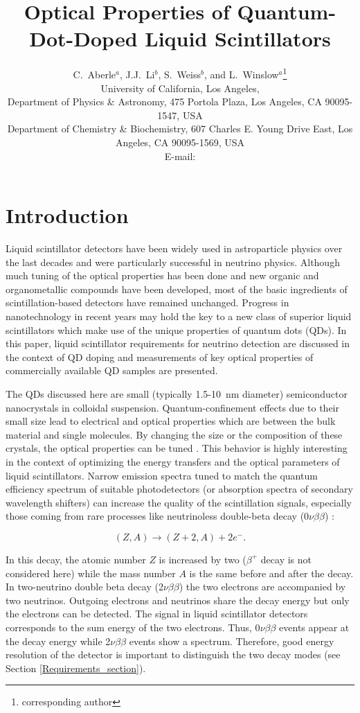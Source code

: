 \documentclass[cits]{JINST}
\title{Optical Properties of Quantum-Dot-Doped Liquid Scintillators}
\author{C.~Aberle$^a$, J.J.~Li$^b$, S.~Weiss$^b$, and L.~Winslow$^a$\setcounter{footnote}{0}\thanks{corresponding author}\\
University of California, Los Angeles,\\
\llap{$^a$}Department of Physics \& Astronomy, 475 Portola Plaza, Los Angeles, CA 90095-1547, USA\\
\llap{$^b$}Department of Chemistry \& Biochemistry, 607 Charles E. Young Drive East, Los Angeles, CA 90095-1569, USA\\
  E-mail: \email{lwinslow@physics.ucla.edu}}
\begin{document}
\section{Introduction}\label{intro}
Liquid scintillator detectors have been widely used in astroparticle physics over the last decades and were particularly successful in neutrino physics. Although much tuning of the optical properties has been done and new organic and organometallic compounds have been developed, most of the basic ingredients of scintillation-based detectors have remained unchanged. Progress in nanotechnology in recent years may hold the key to a new class of superior liquid scintillators which make use of the unique properties of quantum dots (QDs). In this paper, liquid scintillator requirements for neutrino detection are discussed in the context of QD doping and measurements of key optical properties of commercially available QD samples are presented. 

The QDs discussed here are small (typically 1.5-10~nm diameter) semiconductor nanocrystals in colloidal suspension. Quantum-confinement effects due to their small size lead to electrical and optical properties which are between the bulk material and single molecules. By changing the size or the composition of these crystals, the optical properties can be tuned \cite{alivisatos1996,swafford2006}. This behavior is highly interesting in the context of optimizing the energy transfers and the optical parameters of liquid scintillators. Narrow emission spectra tuned to match the quantum efficiency spectrum of suitable photodetectors (or absorption spectra of secondary wavelength shifters) can increase the quality of the scintillation signals, especially those coming from rare processes like neutrinoless double-beta decay (0$\nu\beta\beta$) \cite{vogel2002}: 

\begin{equation}
(Z,A) \rightarrow (Z+2,A) + 2e^-.
\end{equation}

In this decay, the atomic number $Z$ is increased by two ($\beta^+$ decay is not considered here) while the mass number $A$ is the same before and after the decay. In two-neutrino double beta decay (2$\nu\beta\beta$) the two electrons are accompanied by two neutrinos. Outgoing electrons and neutrinos share the decay energy but only the electrons can be detected. The signal in liquid scintillator detectors corresponds to the sum energy of the two electrons. Thus, 0$\nu\beta\beta$ events appear at the decay energy while 2$\nu\beta\beta$ events show a spectrum. Therefore, good energy resolution of the detector is important to distinguish the two decay modes (see Section \ref{Requirements_section}). 
\end{document}
